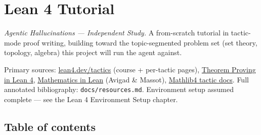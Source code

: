 \chapter{Lean 4 Tutorial}\label{ch:tutorial}

\emph{Agentic Hallucinations --- Independent Study.} A from-scratch tutorial in tactic-mode proof writing, building toward the topic-segmented problem set (set theory, topology, algebra) this project will run the agent against.

Primary sources: \href{https://lean4.dev/tactics}{lean4.dev/tactics} (course + per-tactic pages), \href{https://leanprover.github.io/theorem_proving_in_lean4/}{Theorem Proving in Lean 4}, \href{https://leanprover-community.github.io/mathematics_in_lean/}{Mathematics in Lean} (Avigad \& Massot), \href{https://leanprover-community.github.io/mathlib4_docs/tactics.html}{Mathlib4 tactic docs}. Full annotated bibliography: \texttt{docs/resources.md}. Environment setup assumed complete --- see the Lean 4 Environment Setup chapter.

\section*{Table of contents}

